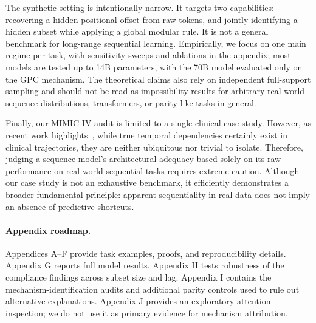 \documentclass[fullpaper]{nldl}
\theoremstyle{plain}
\theoremstyle{definition}
\theoremstyle{remark}
\begin{document}
The synthetic setting is intentionally narrow. It targets two capabilities: recovering a hidden positional offset from raw tokens, and jointly identifying a hidden subset while applying a global modular rule. It is not a general benchmark for long-range sequential learning. Empirically, we focus on one main regime per task, with sensitivity sweeps and ablations in the appendix; most models are tested up to 14B parameters, with the 70B model evaluated only on the GPC mechanism. The theoretical claims also rely on independent full-support sampling and should not be read as impossibility results for arbitrary real-world sequence distributions, transformers, or parity-like tasks in general.

Finally, our MIMIC-IV audit is limited to a single clinical case study. However, as recent work highlights~\citep{edelman2026order_specific_ehr}, while true temporal dependencies certainly exist in clinical trajectories, they are neither ubiquitous nor trivial to isolate. Therefore, judging a sequence model's architectural adequacy based solely on its raw performance on real-world sequential tasks requires extreme caution. Although our case study is not an exhaustive benchmark, it efficiently demonstrates a broader fundamental principle: apparent sequentiality in real data does not imply an absence of predictive shortcuts.

\printbibliography

\appendix

\paragraph{Appendix roadmap.}
Appendices A--F provide task examples, proofs, and reproducibility details. Appendix G reports full model results. Appendix H tests robustness of the compliance findings across subset size and lag. Appendix I contains the mechanism-identification audits and additional parity controls used to rule out alternative explanations. Appendix J provides an exploratory attention inspection; we do not use it as primary evidence for mechanism attribution.
\end{document}
